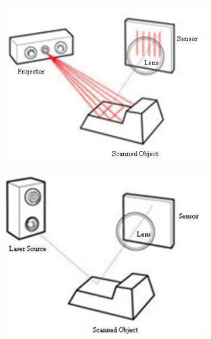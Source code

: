 \begin{figure}[H]
	\begin{subfigure}[b]{.33\textwidth}
	  \centering
	  \includegraphics[width=.9\linewidth]{images/structured-light-scan}
	\end{subfigure}%
	\begin{subfigure}[b]{.33\textwidth}
	  \centering
	  \includegraphics[width=.9\linewidth]{images/triangulate-laser-scan}
	\end{subfigure}
	\begin{subfigure}[b]{.33\textwidth}
	  \centering
		\begin{tikzpicture}[scale=2.5]


\end{tikzpicture}
\end{subfigure}
\end{figure}
